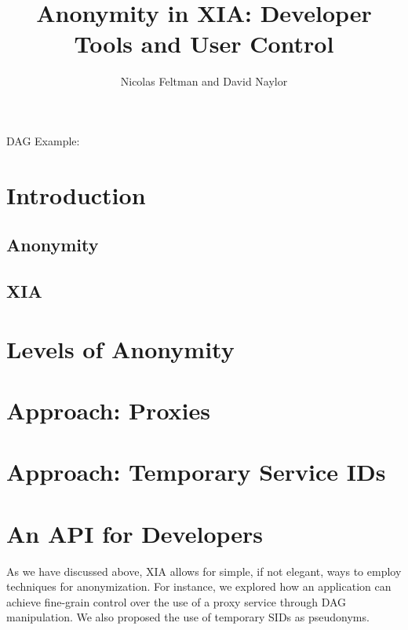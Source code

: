 \documentclass[11pt]{article}
\title{Anonymity in XIA: Developer Tools and User Control}
\author{Nicolas Feltman and David Naylor}
\date{}
\newcommand{\entrynode}[1]{
  \SetVertexNormal[Shape      = circle,
                   FillColor  = black,
                   LineWidth  = 0pt,
                   MinSize    = 0pt]
  \Vertex[L={\tiny\,}]{#1}
  \SetVertexNormal[Shape      = circle,
                   FillColor  = white,
                   LineWidth  = 2pt]
}
\begin{document}
\maketitle


DAG Example:\\
\begin{center}
\end{center}


\section{Introduction}
\subsection{Anonymity}
\subsection{XIA}


\section{Levels of Anonymity}


\section{Approach: Proxies}


\section{Approach: Temporary Service IDs}


\section{An API for Developers}
As we have discussed above, XIA allows for simple, if not elegant, ways to employ techniques for anonymization. For instance, we explored how an application can achieve fine-grain control over the use of a proxy service through DAG manipulation. We also proposed the use of temporary SIDs as pseudonyms.
\end{document}
